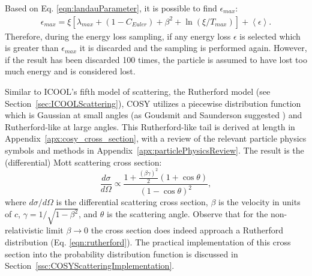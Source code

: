 Based on Eq. \eqref{eqn:landauParameter}, it is possible to find $\epsilon_{max}$:
\begin{align*}
\epsilon_{max}=\xi[\lambda_{max}+(1-C_{Euler})+\beta^2+\ln(\xi/T_{max})]+\left<\epsilon\right>.
\end{align*}
Therefore, during the energy loss sampling, if any energy loss $\epsilon$ is selected which is greater than $\epsilon_{max}$ it is discarded and the sampling is performed again. However, if the result has been discarded 100 times, the particle is assumed to have lost too much energy and is considered lost.

%
%
 \label{sec:COSYScattering}\par
Similar to ICOOL's fifth model of scattering, the Rutherford model (see Section~\ref{sec:ICOOLScattering}), COSY utilizes a piecewise distribution function which is Gaussian  at small angles (as Goudsmit and Saunderson suggested \cite{gs}) and Rutherford-like at large angles. This Rutherford-like tail is derived at length in Appendix~\ref{apx:cosy_cross_section}, with a review of the relevant particle physics symbols and methods in Appendix~\ref{apx:particlePhysicsReview}. The result is the (differential) Mott scattering cross section:
\begin{equation}\label{eqn:MottCrossSection}
\frac{d\sigma}{d\Omega} \propto \frac{1+\frac{(\beta\gamma)^2}{2} (1+\cos\theta)  }{(1-\cos\theta)^2},
\end{equation}
where $d\sigma/d\Omega$ is the differential scattering cross section, $\beta$ is the velocity in units of $c$, $\gamma=1/\sqrt{1-\beta^2}$, and $\theta$ is the scattering angle. Observe that for the non-relativistic limit $\beta\rightarrow 0$ the cross section does indeed approach a Rutherford distribution (Eq. \eqref{eqn:rutherford}). The practical implementation of this cross section into the probability distribution function is discussed in Section~\ref{ssc:COSYScatteringImplementation}.

